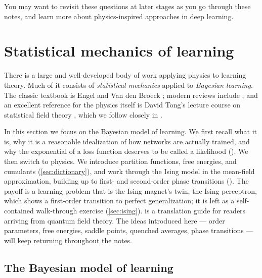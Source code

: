 \documentclass[11pt]{article}
\begin{document}
\noindent You may want to revisit these questions at later stages as you go through these notes, and learn more about physics-inspired approaches in deep learning.




\section{Statistical mechanics of learning}
\label{sec:statmech}

There is a large and well-developed body of work applying physics to learning theory. Much of it consists of \emph{statistical mechanics} applied to \emph{Bayesian learning}. The classic textbook is Engel and Van den Broeck \cite{engel2001statistical}; modern reviews include \cite{zdeborova2016statistical,bahri2020statistical}; and an excellent reference for the physics itself is David Tong's lecture course on statistical field theory \cite{TongSFT}, which we follow closely in .

In this section we focus on the Bayesian model of learning. We first recall what it is, why it is a reasonable idealization of how networks are actually trained, and why the exponential of a loss function deserves to be called a likelihood (). We then switch to physics. We introduce partition functions, free energies, and cumulants (\cref{sec:dictionary}), and work through the Ising model in the mean-field approximation, building up to first- and second-order phase transitions (). The payoff is a learning problem that is the Ising magnet's twin, the Ising perceptron, which shows a first-order transition to perfect generalization; it is left as a self-contained walk-through exercise (\cref{sec:ising}).  is a translation guide for readers arriving from quantum field theory. The ideas introduced here --- order parameters, free energies, saddle points, quenched averages, phase transitions --- will keep returning throughout the notes.

\subsection{The Bayesian model of learning}
\label{sec:Bayes}
\end{document}
